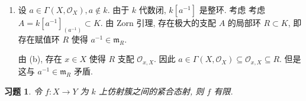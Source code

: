 \documentclass{article}
\theoremstyle{exercise}
\newtheorem{exercise}{习题}[section]
\theoremstyle{plain}
\theoremstyle{remark}
\newenvironment{proofc}{\proof}{\endproof}
\def\gm{\mathfrak{m}}
\def\sO{\mathscr{O}}
\begin{document}
\begin{proofc}
\begin{enumerate}[label=(\alph*)]
          设 $Z$ 是 $X$ 的不可约闭子概形, 考虑到基变换保持有限性和满射性,
          即知 $Z \times_X \tilde{X} \to Z$ 也是有限满射, 从而也满足引理条件.
          同时, 由于其紧合且 $Z$ 不可约, 一定存在 $Z \times_X \tilde{X}$ 的不可约分支 $Z'$
          使得 $Z' \to Z$ 亦是满射.
          为 $Z'$ 配备既约闭子概形结构, 则 $Z' \to Z$ 是紧合满射, 从而满足引理条件.
          由于 $Z \times_X \tilde{X}$ 也是 $\tilde{X}$ 的闭子概形 (习题 3.11),
          即知 $Z'$ 是 $\tilde{X}$ 的不可约闭子概形.

          因此问题归约为: 若 $X$ 是域 $k$ 上的有限型正规整概形,
          $Z$ 是其不可约闭子概形, $X$ 满足条件 (a) 或 (b),
          那么 $Z$ 也满足相同的条件. 通过归纳, 我们不妨假设 $Z$ 在 $X$ 中具有余维数 $1$.
          设 $Z$ 的一般点为 $z$, 则 $\sO_{z, X}$ 是一维整闭 Noether 局部整环,
          因此是离散赋值环.

          现在设 $S \subset K(Z) = k(z)$ 是赋值环, $k \subset S$.
          令 $\pi \colon \sO_{z, X} \to K(Z)$ 为商同态, $R = \pi^{-1}(S)$.
          则 $R$ 是 $K$ 中的赋值环: 任取 $u \in K$, 由于 $\sO_{z, X}$ 是离散赋值环,
          $u \in \sO_{z, X}$ 或 $u^{-1} \in \sO_{z, X}$.
          不妨设为前者. 若 $u \in \gm_z$, 则 $u \in R$;
          否则 $\pi(u)$ 或 $\pi(u^{-1})$ 其中之一属于 $S$, 因此 $u \in R$ 或者 $u^{-1} \in R$.
          综上, 对任意 $u \in K$, 必然有 $u \in R$ 或 $u^{-1} \in R$ 至少一条成立.
          因此 $R$ 是赋值环.

          设 $z' \in Z$ 是 $S$ 在 $Z$ 中的中心,
          则 $\sO_{z', X} = \pi^{-1}(\sO_{z', Z})$ 被 $R$ 支配, 从而 $z'$ 也是 $R$ 在 $X$ 里的中心.
          反之, 若 $z' \in X$ 是 $R$ 的中心,
          则 $\sO_{z', X} \subseteq R \subseteq \sO_{z, X}$, 因此 $z' \in Z$,
          且显然 $z'$ 也是 $Z$ 中 $S$ 的中心. 因此即证.
    \item 设 $a \in \Gamma(X, \sO_X), a \notin k$.
          由于 $k$ 代数闭, $k[a^{-1}]$ 是整环. 考虑
          考虑 $A = k[a^{-1}]_{(a^{-1})} \subset K$.
          由 Zorn 引理, 存在极大的支配 $A$ 的局部环 $R \subset K$,
          即存在赋值环 $R$ 使得 $a^{-1} \in \gm_R$.

          由 (b), 存在 $x \in X$ 使得 $R$ 支配 $\sO_{x, X}$.
          因此 $a \in \Gamma(X, \sO_X) \subseteq \sO_{x, X} \subseteq R$.
          但是这与 $a^{-1} \in \gm_R$ 矛盾. \qedhere
  \end{enumerate}
\end{proofc}

\begin{exercise}
  令 $f \colon X \to Y$ 为 $k$ 上仿射簇之间的紧合态射, 则 $f$ 有限.
\end{exercise}
\end{document}
